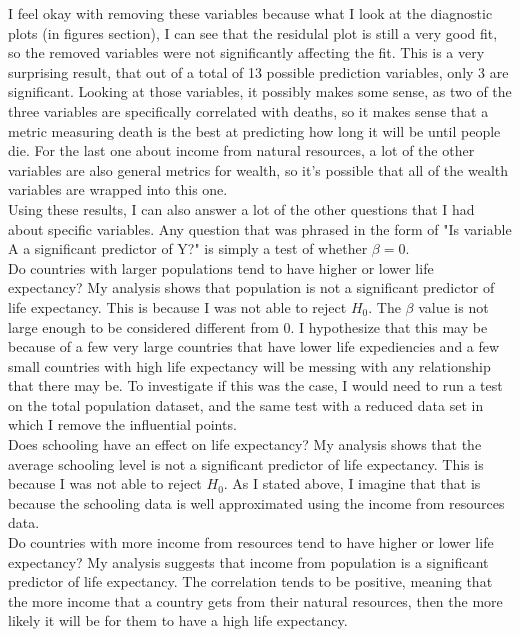 \documentclass{article}
\begin{document}
I feel okay with removing these variables because what I look at the diagnostic plots (in figures section), I can see that the residulal plot is still a very good fit, so the removed variables were not significantly affecting the fit. This is a very surprising result, that out of a total of 13 possible prediction variables, only 3 are significant. Looking at those variables, it possibly makes some sense, as two of the three variables are specifically correlated with deaths, so it makes sense that a metric measuring death is the best at predicting how long it will be until people die. For the last one about income from natural resources, a lot of the other variables are also general metrics for wealth, so it's possible that all of the wealth variables are wrapped into this one.\\
 
	Using these results, I can also answer a lot of the other questions that I had about specific variables. Any question that was phrased in the form of "Is variable A a significant predictor of Y?" is simply a test of whether $\beta = 0$. \\
	
	 Do countries with larger populations tend to have higher or lower life expectancy? My analysis shows that population is not a significant predictor of life expectancy. This is because I was not able to reject $H_0$. The $\beta$ value is not large enough to be considered different from 0. I hypothesize that this may be because of a few very large countries that have lower life expediencies and a few small countries with high life expectancy will be messing with any relationship that there may be. To investigate if this was the case, I would need to run a test on the total population dataset, and the same test with a reduced data set in which I remove the influential points. \\
	
	Does schooling have an effect on life expectancy? My analysis shows that the average schooling level is not a significant predictor of life expectancy. This is because I was not able to reject $H_0$. As I stated above, I imagine that that is because the schooling data is well approximated using the income from resources data. \\

	Do countries with more income from resources tend to have higher or lower life expectancy? My analysis suggests that income from population is a significant predictor of life expectancy. The correlation tends to be positive, meaning that the more income that a country gets from their natural resources, then the more likely it will be for them to have a high life expectancy. \\
	
\end{document}
